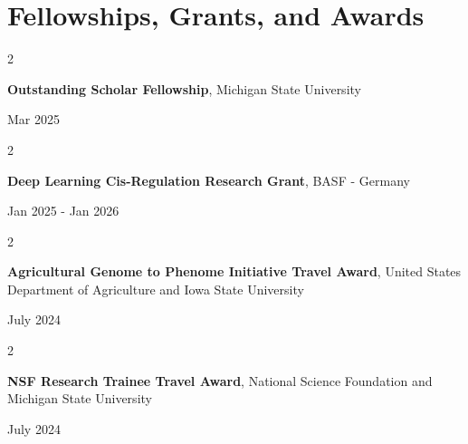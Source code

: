 \documentclass[10pt, letterpaper]{article}
\newenvironment{twocolentry}[2][]{
    \onecolentry
    \def\secondColumn{#2}
    \setcolumnwidth{\fill, 4.5 cm}
    \begin{paracol}{2}
}{
    \switchcolumn \raggedleft \secondColumn
    \end{paracol}
    \endonecolentry
} %
\begin{document}
    \section{Fellowships, Grants, and Awards}




        \begin{samepage} 
            \begin{twocolentry}{
                Mar 2025
                }
                \textbf{Outstanding Scholar Fellowship}, Michigan State University
            \end{twocolentry}
        \end{samepage}  


        \vspace{0.2 cm}

        
        \begin{samepage} 
            \begin{twocolentry}{
                Jan 2025 - Jan 2026
                }
                \textbf{Deep Learning Cis-Regulation Research Grant}, BASF - Germany
            \end{twocolentry}
        \end{samepage}  


        \vspace{0.2 cm}

        
        \begin{samepage} 
            \begin{twocolentry}{
                July 2024
                }
                \textbf{Agricultural Genome to Phenome Initiative Travel Award}, United States Department of Agriculture and Iowa State University
            \end{twocolentry}
        \end{samepage}  


        \vspace{0.2 cm}


        \begin{samepage} 
            \begin{twocolentry}{
                July 2024
                }
                \textbf{NSF Research Trainee Travel Award}, National Science Foundation and Michigan State University
            \end{twocolentry}
        \end{samepage}  


        \vspace{0.2 cm}
\end{document}

